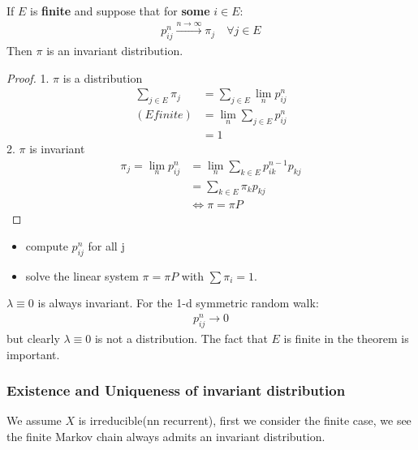 \begin{theorem}
If $E$ is \textbf{finite }and suppose that for \textbf{some} $i \in E$:
\begin{align*}
	p_{ij}^n \overset{n \rightarrow \infty}{\rightarrow} \pi_j \quad \forall j \in E
\end{align*}	
Then $\pi$ is an invariant distribution.
\end{theorem}
\begin{proof}
	1. $\pi$ is a distribution
	\begin{align*}
		\sum_{j \in E} \pi_j &= \sum_{j \in E} \lim_n p_{ij}^n \\
		(E finite) &= \lim_n \sum_{j \in E} p_{ij}^n \\
		&= 1
	\end{align*}
	2. $\pi$ is invariant
	\begin{align*}
		\pi_j = \lim_n p_{ij}^n &= \lim_n \sum_{k \in E}p_{ik}^{n -1} p_{kj}\\
		&= \sum_{k \in E} \pi_k p_{kj}\\
		&\Leftrightarrow \pi = \pi P
	\end{align*}
\end{proof}

\begin{example}
	
\end{example}


\begin{example}\quad
\begin{itemize}
	\item compute $p_{ij}^n$ for all j
	\item solve the linear system $\pi = \pi P$ with $\sum \pi_i = 1$.
\end{itemize}
\end{example}
\begin{remark}
$\lambda \equiv 0$ is always invariant. For the 1-d symmetric random walk:
\begin{align*}
	p_{ij}^n \rightarrow 0
\end{align*}	
but clearly $\lambda \equiv 0$ is not a distribution.
The fact that $E$ is finite in the theorem is important.
\end{remark}



\subsubsection{Existence and Uniqueness of invariant distribution}
	We assume $X$ is irreducible(nn recurrent), first we consider the finite case, we see the finite Markov chain always admits an invariant distribution.

